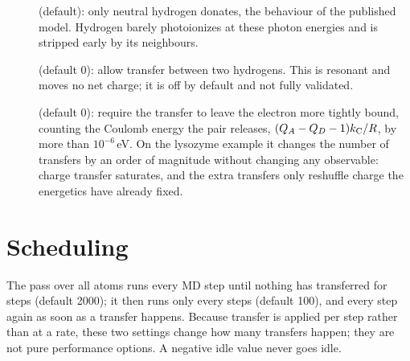 \begin{description}
  \item[] (default): only neutral hydrogen donates, the behaviour of the published
    model.
    Hydrogen barely photoionizes at these photon energies and is stripped early by its neighbours.
  \item[] (default 0): allow transfer between two hydrogens.
    This is resonant and moves no net charge; it is off by default and not fully validated.
  \item[] (default 0): require the transfer to leave the electron more tightly
    bound, counting the Coulomb energy the pair releases, $(Q_A - Q_D - 1)k_{\mathrm C}/R$, by more than $10^{-6}$\,eV.
    On the lysozyme example it changes the number of transfers by an order of magnitude without changing any
    observable: charge transfer saturates, and the extra transfers only reshuffle charge the energetics have already
    fixed.
\end{description}

\section{Scheduling}

The pass over all atoms runs every MD step until nothing has transferred for  steps
(default 2000); it then runs only every  steps (default 100), and every step again
as soon as a transfer happens.
Because transfer is applied per step rather than at a rate, these two settings change how many transfers happen; they
are not pure performance options.
A negative idle value never goes idle.
